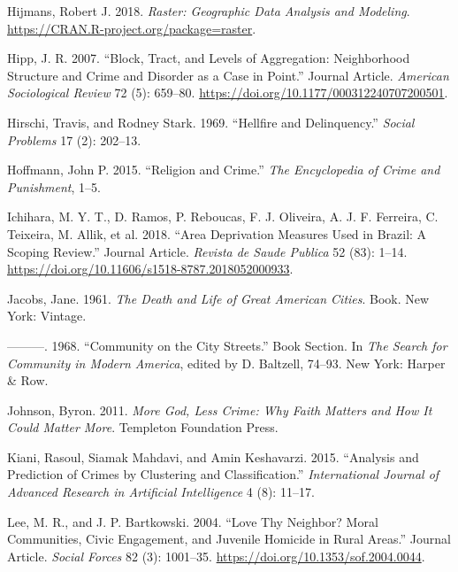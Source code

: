 \documentclass[smallextended]{svjour3}       %
\begin{document}
\leavevmode\hypertarget{ref-Hijmans2018raster}{}%
Hijmans, Robert J. 2018. \emph{Raster: Geographic Data Analysis and
Modeling}. \url{https://CRAN.R-project.org/package=raster}.

\leavevmode\hypertarget{ref-Hipp2007block}{}%
Hipp, J. R. 2007. ``Block, Tract, and Levels of Aggregation:
Neighborhood Structure and Crime and Disorder as a Case in Point.''
Journal Article. \emph{American Sociological Review} 72 (5): 659--80.
\url{https://doi.org/10.1177/000312240707200501}.

\leavevmode\hypertarget{ref-Hirschi1969hellfire}{}%
Hirschi, Travis, and Rodney Stark. 1969. ``Hellfire and Delinquency.''
\emph{Social Problems} 17 (2): 202--13.

\leavevmode\hypertarget{ref-Hoffmann2015religion}{}%
Hoffmann, John P. 2015. ``Religion and Crime.'' \emph{The Encyclopedia
of Crime and Punishment}, 1--5.

\leavevmode\hypertarget{ref-Ichihara2018area}{}%
Ichihara, M. Y. T., D. Ramos, P. Reboucas, F. J. Oliveira, A. J. F.
Ferreira, C. Teixeira, M. Allik, et al. 2018. ``Area Deprivation
Measures Used in Brazil: A Scoping Review.'' Journal Article.
\emph{Revista de Saude Publica} 52 (83): 1--14.
\url{https://doi.org/10.11606/s1518-8787.2018052000933}.

\leavevmode\hypertarget{ref-Jacobs1961death}{}%
Jacobs, Jane. 1961. \emph{The Death and Life of Great American Cities}.
Book. New York: Vintage.

\leavevmode\hypertarget{ref-Jacobs1968community}{}%
---------. 1968. ``Community on the City Streets.'' Book Section. In
\emph{The Search for Community in Modern America}, edited by D.
Baltzell, 74--93. New York: Harper \& Row.

\leavevmode\hypertarget{ref-Johnson2011more}{}%
Johnson, Byron. 2011. \emph{More God, Less Crime: Why Faith Matters and
How It Could Matter More}. Templeton Foundation Press.

\leavevmode\hypertarget{ref-Kiani2015analysis}{}%
Kiani, Rasoul, Siamak Mahdavi, and Amin Keshavarzi. 2015. ``Analysis and
Prediction of Crimes by Clustering and Classification.''
\emph{International Journal of Advanced Research in Artificial
Intelligence} 4 (8): 11--17.

\leavevmode\hypertarget{ref-Lee2004love}{}%
Lee, M. R., and J. P. Bartkowski. 2004. ``Love Thy Neighbor? Moral
Communities, Civic Engagement, and Juvenile Homicide in Rural Areas.''
Journal Article. \emph{Social Forces} 82 (3): 1001--35.
\url{https://doi.org/10.1353/sof.2004.0044}.
\end{document}
